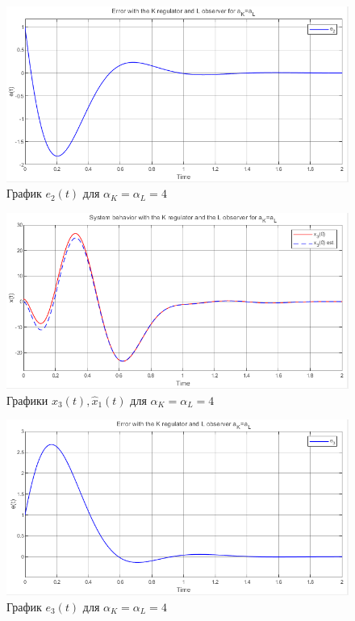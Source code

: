 \documentclass[a4paper, 12pt]{article}
\begin{document}
    \begin{figure}[H]
        \centering
        \includegraphics[scale=0.8]{2task_aK=aL_e2.png}
        \captionsetup{skip=0pt}
        \caption{График $e_2(t)$ для $\alpha_K=\alpha_L=4$}
        \label{2task_aKeqaL_e2}
    \end{figure}
    \newpage
    \vspace*{20mm}
    \begin{figure}[H]
        \centering
        \includegraphics[scale=0.8]{2task_aK=aL_x3.png}
        \captionsetup{skip=0pt}
        \caption{Графики $x_3(t),\hat{x}_1(t)$ для $\alpha_K=\alpha_L=4$}
        \label{2task_aKeqaL_x3}
    \end{figure}
    \begin{figure}[H]
        \centering
        \includegraphics[scale=0.8]{2task_aK=aL_e3.png}
        \captionsetup{skip=0pt}
        \caption{График $e_3(t)$ для $\alpha_K=\alpha_L=4$}
        \label{2task_aKeqaL_e3}
    \end{figure}
\end{document}
